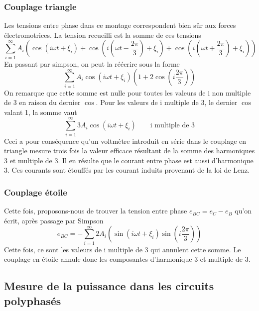 \subsubsection{Couplage triangle}
Les tensions entre phase dans ce montage correspondent bien sûr aux forces électromotrices. La tension recueilli est la somme de ces tensions
\begin{equation}
	\sum _{i = 1}^\infty A_i \left( \cos (i\omega t + \xi _i) + \cos (i(\omega t - \frac{2\pi}{3}) + \xi _i) + \cos (i(\omega t +\frac{2\pi}{3}) + \xi _i) \right)
\end{equation}
En passant par simpson, on peut la réécrire sous la forme
\begin{equation}
	\sum _{i = 1}^\infty A_i \cos (i\omega t + \xi _i) \left( 1+2\cos (i\frac{2\pi}{3}) \right)
\end{equation}
On remarque que cette somme est nulle pour toutes les valeurs de i non multiple de 3 en raison du dernier $\cos$. Pour les valeurs de i multiple de 3, le dernier $\cos$ valant 1, la somme vaut 
\begin{equation}
	\sum _{i = 1}^\infty 3A_i \cos (i\omega t + \xi _i) \qquad \mbox{i multiple de 3}
\end{equation}
Ceci a pour conséquence qu'un voltmètre introduit en série dans le couplage en triangle mesure trois fois la valeur efficace résultant de la somme des harmoniques 3 et multiple de 3. Il en résulte que le courant entre phase est aussi d'harmonique 3. Ces courants sont étouffés par les courant induits provenant de la loi de Lenz. 

\subsubsection{Couplage étoile}
Cette fois, proposons-nous de trouver la tension entre phase $e_{BC} = e_C - e_B$ qu'on écrit, après passage par Simpson 
\begin{equation}
	e_{BC} = -\sum _{i=1}^\infty 2 A_i \left(\sin (i\omega t + \xi _i )\sin (i\frac{2\pi}{3})\right)
\end{equation}
	Cette fois, ce sont les valeurs de i multiple de 3 qui annulent cette somme. Le couplage en étoile annule donc les composantes d'harmonique 3 et multiple de 3. 
	
	
\subsection{Mesure de la puissance dans les circuits polyphasés}
